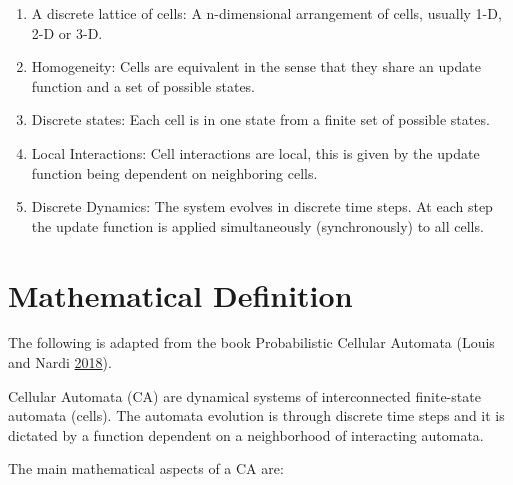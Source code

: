 \documentclass[
]{book}
\begin{document}
\begin{enumerate}
\def\labelenumi{\arabic{enumi}.}
\item
  A discrete lattice of cells:
  A n-dimensional arrangement of cells, usually 1-D, 2-D or 3-D.
\item
  Homogeneity:
  Cells are equivalent in the sense that they share an update function and a set of possible states.
\item
  Discrete states:
  Each cell is in one state from a finite set of possible states.
\item
  Local Interactions:
  Cell interactions are local, this is given by the update function being dependent on neighboring cells.
\item
  Discrete Dynamics:
  The system evolves in discrete time steps. At each step the update function is applied simultaneously (synchronously) to all cells.
\end{enumerate}

\hypertarget{mathematical-definition}{%
\section{Mathematical Definition}\label{mathematical-definition}}

The following is adapted from the book Probabilistic Cellular Automata (Louis and Nardi \protect\hyperlink{ref-louis2018probabilistic}{2018}).

Cellular Automata (CA) are dynamical systems of interconnected finite-state automata (cells). The automata evolution is through discrete time steps and it is dictated by a function dependent on a neighborhood of interacting automata.

The main mathematical aspects of a CA are:
\end{document}
